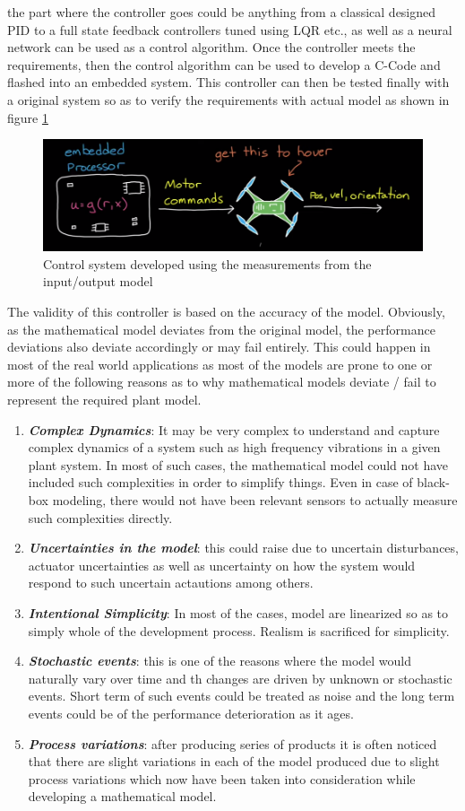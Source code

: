the part where the controller goes could be anything from a classical designed PID to a full state feedback controllers tuned using LQR etc., as well as a neural network can be used as a control algorithm. Once the controller meets the requirements, then the control algorithm can be used to develop a C-Code and flashed into an embedded system. This controller can then be tested finally with a original system so as to verify the requirements with actual model as shown in figure \ref{fig_RobustControlReasons3}
\begin{figure}[h!]
	\centering
	\includegraphics[width=0.6\linewidth]{Bilder/RobustControlSystem_Reasons3.png}
	\caption{Control system developed using the measurements from the input/output model}
	\label{fig_RobustControlReasons3}
\end{figure}
The validity of this controller is based on the accuracy of the model. Obviously, as the mathematical model deviates from the original model, the performance deviations also deviate accordingly or may fail entirely. This could happen in most of the real world applications as  most of the models are prone to one or more of the following reasons as to why mathematical models deviate / fail to represent the required plant model.
\begin{enumerate}
	\item \textbf{\textit{Complex Dynamics}}: It may be very complex to understand and capture complex dynamics of a system such as high frequency vibrations in a given plant system. In most of such cases, the mathematical model could not have included such complexities in order to simplify things. Even in case of black-box modeling, there would not have been relevant sensors to actually measure such complexities directly.
	\item \textbf{\textit{Uncertainties in the model}}: this could raise due to uncertain disturbances, actuator uncertainties as well as uncertainty on how the system would respond to such uncertain actautions among others.
	\item \textbf{\textit{Intentional Simplicity}}: In most of the cases, model are linearized so as to simply whole of the development process. Realism is sacrificed for simplicity. 
	\item \textbf{\textit{Stochastic events}}: this is one of the reasons where the model would naturally vary over time and th changes are driven by unknown or stochastic events. Short term of such events could be treated as noise and the long term events could be of the performance deterioration as it ages. 
	\item \textbf{\textit{Process variations}}: after producing series of products it is often noticed that there are slight variations in each of the model produced due to slight process variations which now have been taken into consideration while developing a mathematical model. 
\end{enumerate}
